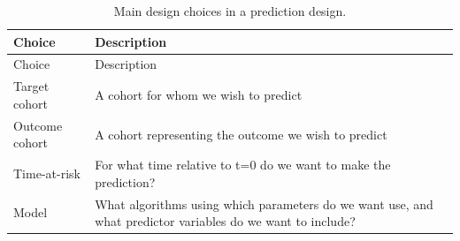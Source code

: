 \documentclass[11pt]{book}
\begin{document}
\begin{longtable}[]{@{}ll@{}}
\caption{\label{tab:plpDesign} Main design choices in a prediction
design.}\tabularnewline
\toprule
\begin{minipage}[b]{0.23\columnwidth}\raggedright\strut
Choice\strut
\end{minipage} & \begin{minipage}[b]{0.71\columnwidth}\raggedright\strut
Description\strut
\end{minipage}\tabularnewline
\midrule
\endfirsthead
\toprule
\begin{minipage}[b]{0.23\columnwidth}\raggedright\strut
Choice\strut
\end{minipage} & \begin{minipage}[b]{0.71\columnwidth}\raggedright\strut
Description\strut
\end{minipage}\tabularnewline
\midrule
\endhead
\begin{minipage}[t]{0.23\columnwidth}\raggedright\strut
Target cohort\strut
\end{minipage} & \begin{minipage}[t]{0.71\columnwidth}\raggedright\strut
A cohort for whom we wish to predict\strut
\end{minipage}\tabularnewline
\begin{minipage}[t]{0.23\columnwidth}\raggedright\strut
Outcome cohort\strut
\end{minipage} & \begin{minipage}[t]{0.71\columnwidth}\raggedright\strut
A cohort representing the outcome we wish to predict\strut
\end{minipage}\tabularnewline
\begin{minipage}[t]{0.23\columnwidth}\raggedright\strut
Time-at-risk\strut
\end{minipage} & \begin{minipage}[t]{0.71\columnwidth}\raggedright\strut
For what time relative to t=0 do we want to make the prediction?\strut
\end{minipage}\tabularnewline
\begin{minipage}[t]{0.23\columnwidth}\raggedright\strut
Model\strut
\end{minipage} & \begin{minipage}[t]{0.71\columnwidth}\raggedright\strut
What algorithms using which parameters do we want use, and what
predictor variables do we want to include?\strut
\end{minipage}\tabularnewline
\bottomrule
\end{longtable}
\end{document}
